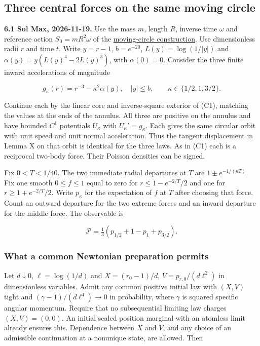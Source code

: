 \documentclass[11pt,a4paper]{article}
\begin{document}
\subsection{Three central forces on the same moving
circle}\label{three-central-forces-on-the-same-moving-circle}

\textbf{6.1 Sol Max, 2026-11-19.} Use the mass \(m\), length \(R\),
inverse time \(\omega\) and reference action \(S_0=mR^2\omega\) of the
\href{balaban-ode-lesson.md\#tangent-orbits-under-the-two-impulse-orders}{moving-circle
construction}. Use dimensionless radii \(r\) and time \(t\). Write
\(y=r-1\), \(b=e^{-20}\), \(L(y)=\log(1/|y|)\) and
\(\alpha(y)=y(L(y)^4-2L(y)^3)\), with \(\alpha(0)=0\). Consider the
three finite inward accelerations of magnitude

\[
 g_\kappa(r)=r^{-3}-\kappa^2\alpha(y),\quad |y|\le b,
 \qquad \kappa\in\{1/2,1,3/2\}.                                  \tag{25}
\]

Continue each by the linear core and inverse-square exterior of (C1),
matching the values at the ends of the annulus. All three are positive
on the annulus and have bounded \(C^1\) potentials \(U_\kappa\) with
\(U_\kappa'=g_\kappa\). Each gives the same circular orbit with unit
speed and unit normal acceleration. Thus the tangent displacement in
Lemma X on that orbit is identical for the three laws. As in (C1) each
is a reciprocal two-body force. Their Poisson densities can be signed.

Fix \(0<T<1/40\). The two immediate radial departures at \(T\) are
\(1\pm e^{-1/(\kappa T)}\). Fix one smooth \(0\le f\le1\) equal to zero
for \(r\le1-e^{-2/T}/2\) and one for \(r\ge1+e^{-2/T}/2\). Write
\(p_\kappa\) for the expectation of \(f\) at \(T\) after choosing that
force. Count an outward departure for the two extreme forces and an
inward departure for the middle force. The observable is

\[
 \mathcal P=\tfrac13(p_{1/2}+1-p_1+p_{3/2}).                      \tag{26}
\]

\subsubsection{What a common Newtonian preparation
permits}\label{what-a-common-newtonian-preparation-permits}

Let \(d\downarrow0\), \(\ell=\log(1/d)\) and \(X=(r_0-1)/d\),
\(V=p_{r,0}/(d\ell^2)\) in dimensionless variables. Admit any common
positive initial law with \((X,V)\) tight and
\((\gamma-1)/(d\ell^4)\to0\) in probability, where \(\gamma\) is squared
specific angular momentum. Require that no subsequential limiting law
charges \((X,V)=(0,0)\). An initial scaled position marginal with an
atomless limit already ensures this. Dependence between \(X\) and \(V\),
and any choice of an admissible continuation at a nonunique state, are
allowed. Then
\end{document}
